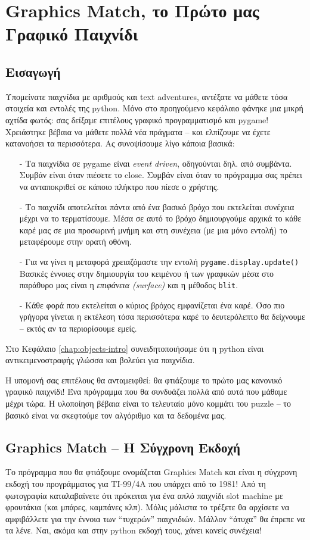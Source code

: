 \chapter{Graphics Match, το Πρώτο μας Γραφικό Παιχνίδι}
\label{chap:graphics-match}
%
\section{Εισαγωγή}
%
Υπομείνατε παιχνίδια με αριθμούς και text adventures, αντέξατε να μάθετε τόσα στοιχεία και εντολές της python. Μόνο στο προηγούμενο κεφάλαιο φάνηκε μια μικρή αχτίδα φωτός: σας δείξαμε επιτέλους γραφικό προγραμματισμό και pygame! Χρειάστηκε βέβαια να μάθετε πολλά νέα πράγματα -- και ελπίζουμε να έχετε κατανοήσει τα περισσότερα. Ας συνοψίσουμε λίγο κάποια βασικά:
%
\begin{itemize}
\item[-] Τα παιχνίδια σε pygame είναι {\em event driven}, οδηγούνται δηλ. από συμβάντα. Συμβάν είναι όταν πιέσετε το close. Συμβάν είναι όταν το πρόγραμμα σας πρέπει να ανταποκριθεί σε κάποιο πλήκτρο που πίεσε ο χρήστης.
\item[-] Το παιχνίδι αποτελείται πάντα από ένα βασικό βρόχο που εκτελείται συνέχεια μέχρι να το τερματίσουμε. Μέσα σε αυτό το βρόχο δημιουργούμε αρχικά το κάθε καρέ μας σε μια προσωρινή μνήμη και στη συνέχεια (με μια μόνο εντολή) το μεταφέρουμε στην ορατή οθόνη.
\item[-] Για να γίνει η μεταφορά χρειαζόμαστε την εντολή {\tt pygame.display.update()}
Βασικές έννοιες στην δημιουργία του κειμένου ή των γραφικών μέσα στο παράθυρο μας είναι η {\em επιφάνεια (surface)} και η μέθοδος {\tt blit}.
\item[-] Κάθε φορά που εκτελείται ο κύριος βρόχος εμφανίζεται ένα καρέ. Όσο πιο γρήγορα γίνεται η εκτέλεση τόσα περισσότερα καρέ το δευτερόλεπτο θα δείχνουμε -- εκτός αν τα περιορίσουμε εμείς.
\end{itemize}
%
Στο Κεφάλαιο \ref{chap:objects-intro} συνειδητοποιήσαμε ότι η python είναι αντικειμενοστραφής γλώσσα και βολεύει για παιχνίδια.

Η υπομονή σας επιτέλους θα ανταμειφθεί: θα φτιάξουμε το πρώτο μας κανονικό γραφικό παιχνίδι! Ένα πρόγραμμα που θα συνδυάζει πολλά από αυτά που μάθαμε μέχρι τώρα. Η υλοποίηση βέβαια είναι το τελευταίο μόνο κομμάτι του puzzle -- το βασικό είναι να σκεφτούμε τον αλγόριθμο και τα δεδομένα μας.
%
\section{Graphics Match -- Η Σύγχρονη Εκδοχή}
%
Το πρόγραμμα που θα φτιάξουμε ονομάζεται Graphics Match και είναι η σύγχρονη εκδοχή του προγράμματος για TI-99/4A που υπάρχει από το 1981! Από τη φωτογραφία καταλαβαίνετε ότι πρόκειται για ένα απλό παιχνίδι slot machine με φρουτάκια (και μπάρες, καμπάνες κλπ). Μόλις μάλιστα το τρέξετε θα αρχίσετε να αμφιβάλλετε για την έννοια των ``τυχερών'' παιχνιδιών. Μάλλον ``άτυχα'' θα έπρεπε να τα λένε. Ναι, ακόμα και στην python εκδοχή τους, χάνει κανείς συνέχεια!

